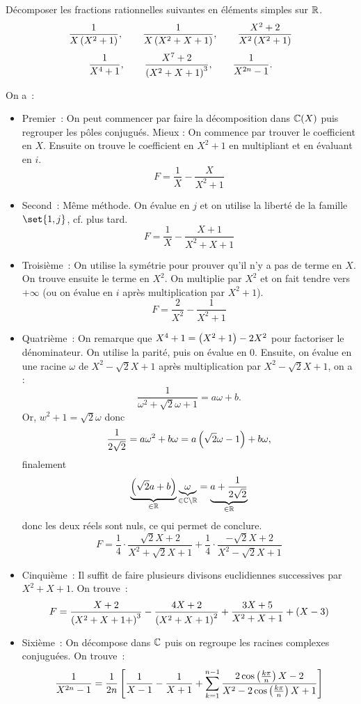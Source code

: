 \documentclass{magnolia}
\begin{document}
\begin{exoUnique}
\exo Décomposer les fractions rationnelles suivantes en éléments simples sur
  $\mathbb{R}$.
  \[\frac{1}{X\left(X^2+1\right)}, \qquad \frac{1}{X\left(X^2+X+1\right)}, \qquad
    \frac{X^2+2}{X^2\left(X^2+1\right)}\]
  \[\frac{1}{X^4+1}, \qquad \frac{X^7+2}{\left(X^2+X+1\right)^3}, \qquad
    \frac{1}{X^{2n}-1}.\]
  \begin{sol}
  On a~:
  \begin{itemize}
  \item Premier~: On peut commencer par faire la décomposition dans $\fracC$
    puis regrouper les pôles conjugués.
    Mieux : On commence par trouver le coefficient en $X$. Ensuite on
    trouve le coefficient en $X^2+1$ en multipliant et en évaluant en $i$.
    \[F=\frac{1}{X}-\frac{X}{X^2+1}\]
  \item Second~: Même méthode. On évalue en $j$ et on utilise la liberté de la famille $\set{1,j}$, cf. plus tard.
    \[F=\frac{1}{X}-\frac{X+1}{X^2+X+1}\]
  \item Troisième~: On utilise la symétrie pour prouver qu'il n'y a pas de terme
    en $X$. On trouve ensuite le terme en $X^2$. On multiplie par $X^2$ et on fait
    tendre vers $+\infty$ (ou on évalue en $i$ après multiplication par $X^2+1$).
    \[F=\frac{2}{X^2}-\frac{1}{X^2+1}\]
  \item Quatrième~: On remarque que $X^4+1=\left(X^2+1\right)-2X^2$ pour factoriser le
    dénominateur. On utilise la parité, puis on évalue en $0$. Ensuite, on évalue
    en une racine $\omega$ de $X^2-\sqrt{2}X+1$ après multiplication par $X^2-\sqrt{2}X+1$, on a :
    $$\frac{1}{\omega^2+\sqrt{2}\omega+1}=a\omega+b.$$ Or, $w^2+1=\sqrt{2}\omega$ donc $$\frac{1}{2\sqrt{2}}=a\omega^2+b\omega=a\left(\sqrt{2}\omega-1\right)+b\omega,$$ finalement $$\underbrace{\left(\sqrt{2}a+b\right)}_{\in \mathbb{R}}\underbrace{\omega}_{\in \mathbb{C}\setminus\mathbb{R}}=\underbrace{a+\frac{1}{2\sqrt{2}}}_{\in \mathbb{R}}$$ donc les deux réels sont nuls, ce qui permet de conclure. 
    \[F=\frac{1}{4}\cdot\frac{\sqrt{2}X+2}{X^2+\sqrt{2}X+1}+\frac{1}{4}\cdot
      \frac{-\sqrt{2}X+2}{X^2-\sqrt{2}X+1}\]
  \item Cinquième~: Il suffit de faire plusieurs divisons euclidiennes
    successives par $X^2+X+1$. On trouve~:
    \[F=\frac{X+2}{\left(X^2+X+1+\right)^3}-\frac{4X+2}{\left(X^2+X+1\right)^2}+
        \frac{3X+5}{X^2+X+1}+\left(X-3\right)\]
  \item Sixième~: On décompose dans $\mathbb{C}$ puis on regroupe les racines complexes
    conjuguées. On trouve~:
    \[\frac{1}{X^{2n}-1}=\frac{1}{2n}\left[\frac{1}{X-1}-\frac{1}{X+1}+\sum_{k=1}^{n-1}
      \frac{2\cos\left(\frac{k\pi}{n}\right)X-2}{X^2-2\cos\left(\frac{k\pi}{n}\right)X+1}\right]\]
  \end{itemize}
  \end{sol}
\end{exoUnique}
\end{document}

